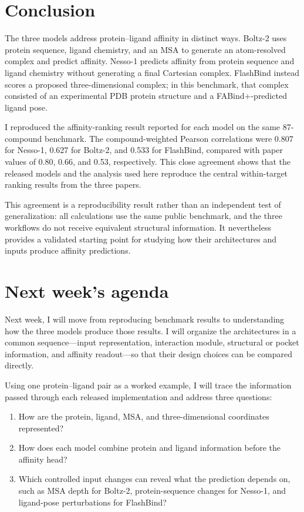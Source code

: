 \documentclass[11pt]{article}
\begin{document}
\section{Conclusion}

The three models address protein--ligand affinity in distinct ways. Boltz-2
uses protein sequence, ligand chemistry, and an MSA to generate an
atom-resolved complex and predict affinity. Nesso-1 predicts affinity from
protein sequence and ligand chemistry without generating a final Cartesian
complex. FlashBind instead scores a proposed three-dimensional complex; in
this benchmark, that complex consisted of an experimental PDB protein
structure and a FABind+-predicted ligand pose.

I reproduced the affinity-ranking result reported for each model on
the same 87-compound benchmark. The compound-weighted Pearson correlations
were 0.807 for Nesso-1, 0.627 for Boltz-2, and 0.533 for FlashBind, compared
with paper values of 0.80, 0.66, and 0.53, respectively. This close agreement shows
that the released models and the analysis used here reproduce the central
within-target ranking results from the three papers.

This agreement is a reproducibility result rather than an independent test of
generalization: all calculations use the same public benchmark, and the three
workflows do not receive equivalent structural information. It nevertheless
provides a validated starting point for studying how their architectures and
inputs produce affinity predictions.

\section{Next week's agenda}

Next week, I will move from reproducing benchmark results to understanding how
the three models produce those results. I will organize the architectures in
a common sequence---input representation, interaction module, structural or
pocket information, and affinity readout---so that their design choices can be
compared directly.

Using one protein--ligand pair as a worked example, I will trace the
information passed through each released implementation and address three
questions:
\begin{enumerate}
  \item How are the protein, ligand, MSA, and three-dimensional coordinates
  represented?
  \item How does each model combine protein and ligand information before the
  affinity head?
  \item Which controlled input changes can reveal what the prediction depends
  on, such as MSA depth for Boltz-2, protein-sequence changes for Nesso-1, and
  ligand-pose perturbations for FlashBind?
\end{enumerate}
\end{document}
